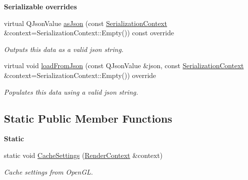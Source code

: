 \begin{Indent}\textbf{ Serializable overrides}\par
\begin{DoxyCompactItemize}
\item 
\mbox{\label{classrev_1_1_render_settings_ac670c3a426c83cdbad17e635e6ee670b}} 
virtual Q\+Json\+Value \mbox{\hyperlink{classrev_1_1_render_settings_ac670c3a426c83cdbad17e635e6ee670b}{as\+Json}} (const \mbox{\hyperlink{structrev_1_1_serialization_context}{Serialization\+Context}} \&context=Serialization\+Context\+::\+Empty()) const override
\begin{DoxyCompactList}\small\item\em Outputs this data as a valid json string. \end{DoxyCompactList}\item 
\mbox{\label{classrev_1_1_render_settings_a89e8078e8004befe8b9a388e7fce6d69}} 
virtual void \mbox{\hyperlink{classrev_1_1_render_settings_a89e8078e8004befe8b9a388e7fce6d69}{load\+From\+Json}} (const Q\+Json\+Value \&json, const \mbox{\hyperlink{structrev_1_1_serialization_context}{Serialization\+Context}} \&context=Serialization\+Context\+::\+Empty()) override
\begin{DoxyCompactList}\small\item\em Populates this data using a valid json string. \end{DoxyCompactList}\end{DoxyCompactItemize}
\end{Indent}
\subsection*{Static Public Member Functions}
\begin{Indent}\textbf{ Static}\par
\begin{DoxyCompactItemize}
\item 
\mbox{\label{classrev_1_1_render_settings_a453bc36036f083f5f584ecd2bf54b8ba}} 
static void \mbox{\hyperlink{classrev_1_1_render_settings_a453bc36036f083f5f584ecd2bf54b8ba}{Cache\+Settings}} (\mbox{\hyperlink{classrev_1_1_render_context}{Render\+Context}} \&context)
\begin{DoxyCompactList}\small\item\em Cache settings from Open\+GL. \end{DoxyCompactList}\end{DoxyCompactItemize}
\end{Indent}
